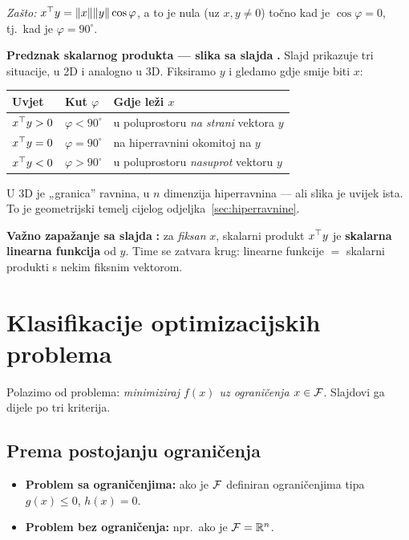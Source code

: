 \emph{Zašto:} $x^{\top} y = \|x\|\|y\|\cos\varphi$, a to je nula (uz $x, y \ne 0$)
točno kad je $\cos\varphi = 0$, tj.\ kad je $\varphi = 90^\circ$.

\textbf{Predznak skalarnog produkta --- slika sa slajda} \textbf{.} Slajd prikazuje tri situacije, u 2D i analogno u 3D. Fiksiramo
$y$ i gledamo gdje smije biti $x$:

\begin{center}
\begin{tabular}{lll}
\toprule
\textbf{Uvjet} & \textbf{Kut} $\varphi$ & \textbf{Gdje leži $x$} \\
\midrule
$x^{\top} y > 0$ & $\varphi < 90^\circ$ & u poluprostoru \emph{na strani} vektora $y$ \\
$x^{\top} y = 0$ & $\varphi = 90^\circ$ & na hiperravnini okomitoj na $y$ \\
$x^{\top} y < 0$ & $\varphi > 90^\circ$ & u poluprostoru \emph{nasuprot} vektoru $y$ \\
\bottomrule
\end{tabular}
\end{center}

U 3D je „granica” ravnina, u $n$ dimenzija hiperravnina --- ali slika je uvijek
ista. To je geometrijski temelj cijelog odjeljka~\ref{sec:hiperravnine}.

\textbf{Važno zapažanje sa slajda} \textbf{:} za \emph{fiksan} $x$,
skalarni produkt $x^{\top} y$ je \textbf{skalarna linearna funkcija} od $y$. Time se
zatvara krug: linearne funkcije $=$ skalarni produkti s nekim fiksnim vektorom.

\section{Klasifikacije optimizacijskih problema}

Polazimo od problema: \emph{minimiziraj $f(x)$ uz ograničenja
$x \in \mathcal{F}$}. Slajdovi ga dijele po tri kriterija.

\subsection{Prema postojanju ograničenja}

\begin{itemize}
  \item \textbf{Problem sa ograničenjima:} ako je $\mathcal{F}$ definiran
        ograničenjima tipa $g(x) \le 0$, $h(x) = 0$.
  \item \textbf{Problem bez ograničenja:} npr.\ ako je $\mathcal{F} = \mathbb{R}^n$.
\end{itemize}

